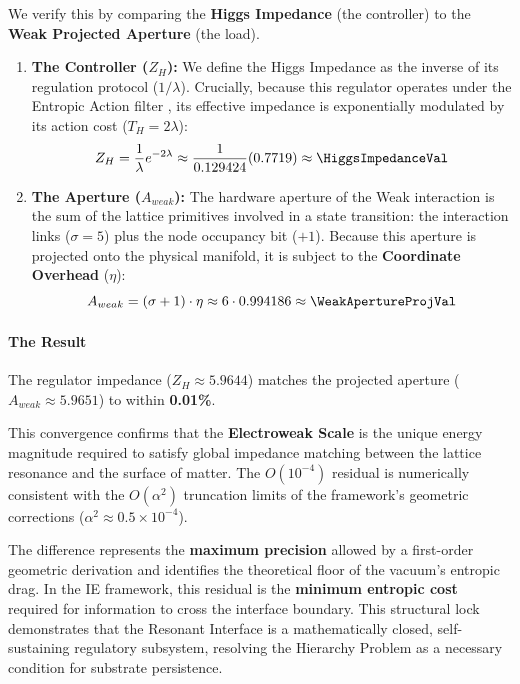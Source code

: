 We verify this by comparing the \textbf{Higgs Impedance} (the controller) to the \textbf{Weak Projected Aperture} (the load).

\begin{enumerate}
    \item \textbf{The Controller ($Z_H$):} We define the Higgs Impedance as the inverse of its regulation protocol ($1/\lambda$). Crucially, because this regulator operates under the Entropic Action filter  \cite{meyer_ieaction_2026}, its effective impedance is exponentially modulated by its action cost ($T_H = 2\lambda$):
    \begin{equation}
    Z_H = \frac{1}{\lambda} e^{-2\lambda} \approx \frac{1}{0.129424} (0.7719) \approx \mathbf{\HiggsImpedanceVal}
    \end{equation}
    
    \item \textbf{The Aperture ($A_{weak}$):} The hardware aperture of the Weak interaction is the sum of the lattice primitives involved in a state transition: the interaction links ($\sigma=5$) plus the node occupancy bit ($+1$). Because this aperture is projected onto the physical manifold, it is subject to the \textbf{Coordinate Overhead} ($\eta$):
    \begin{equation}
    A_{weak} = (\sigma + 1) \cdot \eta \approx 6 \cdot 0.994186 \approx \mathbf{\WeakApertureProjVal}
    \end{equation}
\end{enumerate}

\paragraph{The Result}
The regulator impedance ($Z_H \approx 5.9644$) matches the projected aperture ($A_{weak} \approx 5.9651$) to within \textbf{0.01\%}. 

This convergence confirms that the \textbf{Electroweak Scale} is the unique energy magnitude required to satisfy global impedance matching between the lattice resonance and the surface of matter. The $O(10^{-4})$ residual is numerically consistent with the $O(\alpha^2)$ truncation limits of the framework's geometric corrections ($\alpha^2 \approx 0.5 \times 10^{-4}$). 

The difference represents the \textbf{maximum precision} allowed by a first-order geometric derivation and identifies the theoretical floor of the vacuum's entropic drag. In the IE framework, this residual is the \textbf{minimum entropic cost} required for information to cross the interface boundary. This structural lock demonstrates that the Resonant Interface is a mathematically closed, self-sustaining regulatory subsystem, resolving the Hierarchy Problem as a necessary condition for substrate persistence.